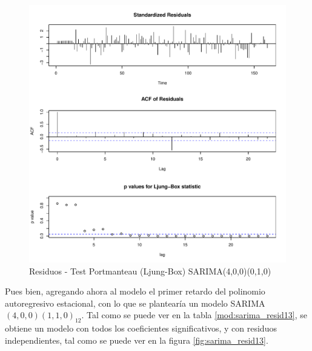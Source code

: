 \documentclass[12pt,oneside]{book}\usepackage[]{graphicx}\usepackage[]{color}
\makeatletter
\def\maxwidth{ %
  \ifdim\Gin@nat@width>\linewidth
    \linewidth
  \else
    \Gin@nat@width
  \fi
}
\newenvironment{knitrout}{}{} %
\theoremstyle{definition} %
\makeatother
\begin{document}
\begin{knitrout}
\color{fgcolor}\begin{figure}[H]

{\centering \includegraphics[width=\maxwidth]{figure/unnamed-chunk-17-1} 

}

\caption{\label{fig:sarima_resid12} Residuos - Test Portmanteau (Ljung-Box) SARIMA(4,0,0)(0,1,0)}\label{fig:unnamed-chunk-17}
\end{figure}


\end{knitrout}


Pues bien, agregando ahora al modelo el primer retardo del polinomio autoregresivo estacional, con lo que se plantearía un modelo SARIMA$(4,0,0)(1,1,0)_{12}$. Tal como se puede ver en la tabla \ref{mod:sarima_resid13}, se obtiene un modelo con todos los coeficientes significativos, y con residuos independientes, tal como se puede ver en la figura \ref{fig:sarima_resid13}. 
\end{document}
